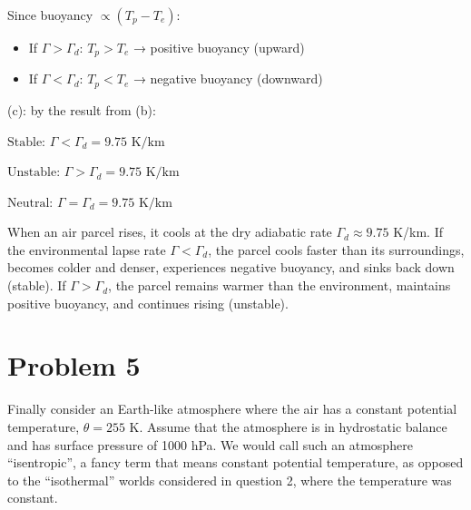 \documentclass[letterpaper, 11pt]{article}
\newcommand{\1}{\mathds{1}}	%
\theoremstyle{definition}
\begin{document}
Since buoyancy $\propto (T_p - T_e)$:
\begin{itemize}
\item If $\Gamma > \Gamma_d$: $T_p > T_e$ → positive buoyancy (upward)
\item If $\Gamma < \Gamma_d$: $T_p < T_e$ → negative buoyancy (downward)
\end{itemize}

(c):
by the result from (b):

$\text{Stable: } \Gamma < \Gamma_d = 9.75 \text{ K/km}$

$\text{Unstable: } \Gamma > \Gamma_d = 9.75 \text{ K/km}$

$\text{Neutral: } \Gamma = \Gamma_d = 9.75 \text{ K/km}$

When an air parcel rises, it cools at the dry adiabatic rate $\Gamma_d \approx 9.75$ K/km. If the environmental lapse rate $\Gamma < \Gamma_d$, the parcel cools faster than its surroundings, becomes colder and denser, experiences negative buoyancy, and sinks back down (stable). If $\Gamma > \Gamma_d$, the parcel remains warmer than the environment, maintains positive buoyancy, and continues rising (unstable).
\section*{Problem 5}
Finally consider an Earth-like atmosphere where the air has a constant potential temperature, $\theta = 255$ K. Assume that the atmosphere is in hydrostatic balance and has surface pressure of 1000 hPa. We would call such an atmosphere ``isentropic'', a fancy term that means constant potential temperature, as opposed to the ``isothermal'' worlds considered in question 2, where the temperature was constant.
\end{document}

